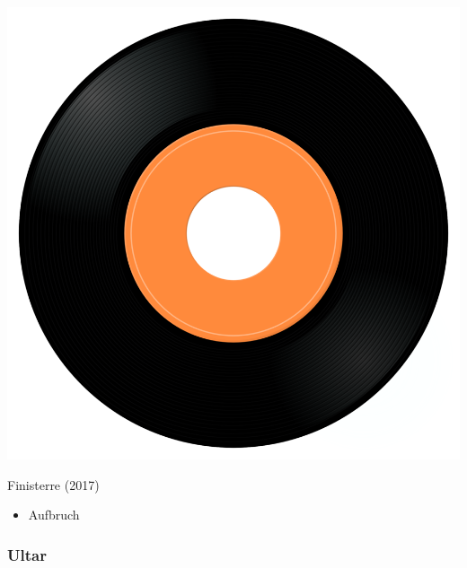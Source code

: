 \begin{minipage}[t]{0.25\textwidth}
\captionsetup{type=figure}
\includegraphics[width=\textwidth]{Images/cover.png}
\caption*{Finisterre (2017)}
\end{minipage}
\begin{minipage}[t]{0.25\textwidth}\vspace{0pt}
\begin{itemize}[nosep,leftmargin=1em,labelwidth=*,align=left]
	\setlength{\itemsep}{0pt}
	\item Aufbruch
\end{itemize}
\end{minipage}

\subsubsection{Ultar}

